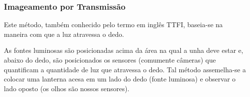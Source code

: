 \subsubsection{Imageamento por Transmissão} \label{transmission}
Este método, também conhecido pelo termo em inglês \acrfull{TTFI}, baseia-se na maneira com que a luz atravessa o dedo.

As fontes luminosas são posicionadas acima da área na qual a unha deve estar e, abaixo do dedo, são posicionados os sensores (comumente câmeras) que quantificam a quantidade de luz que atravessa o dedo. Tal método assemelha-se a colocar uma lanterna acesa em um lado do dedo (fonte luminosa) e observar o lado oposto (os olhos são nossos sensores).
